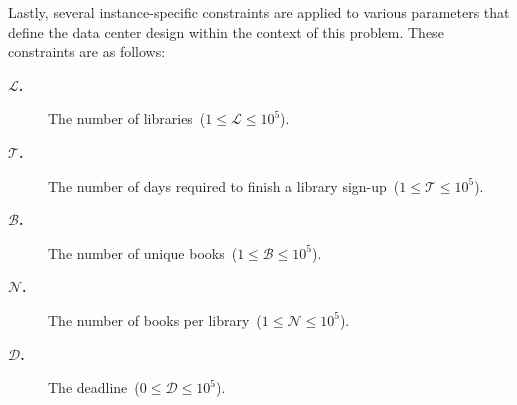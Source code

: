 Lastly, several instance-specific constraints are applied to various parameters
that define the data center design within the context of this problem. These
constraints are as follows:

\begin{description}
  \item[\textbf{$\mathcal{L}$.}] The number of libraries~($ 1 \leq \mathcal{L} \leq 10^5$).
  \item[\textbf{$\mathcal{T}$.}] The number of days required to finish a library sign-up~($ 1 \leq \mathcal{T} \leq 10^5$).
  \item[\textbf{$\mathcal{B}$.}] The number of unique books~($ 1 \leq \mathcal{B} \leq 10^5$).
  \item[\textbf{$\mathcal{N}$.}] The number of books per library~($ 1 \leq \mathcal{N} \leq 10^5$).
  \item[\textbf{$\mathcal{D}$.}] The deadline~($ 0 \leq \mathcal{D} \leq 10^5$).
\end{description}